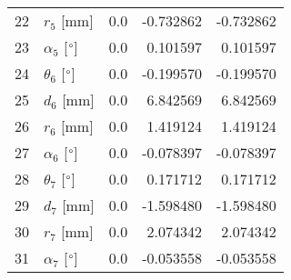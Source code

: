 \documentclass{standalone}%
\begin{document}
\begin{tabular}{llrrr}
22 &              $r_{5}$ [mm] &       0.0 &  -0.732862 &  -0.732862 \\
23 &  $\alpha_{5}$ [$\degree$] &       0.0 &   0.101597 &   0.101597 \\
24 &  $\theta_{6}$ [$\degree$] &       0.0 &  -0.199570 &  -0.199570 \\
25 &              $d_{6}$ [mm] &       0.0 &   6.842569 &   6.842569 \\
26 &              $r_{6}$ [mm] &       0.0 &   1.419124 &   1.419124 \\
27 &  $\alpha_{6}$ [$\degree$] &       0.0 &  -0.078397 &  -0.078397 \\
28 &  $\theta_{7}$ [$\degree$] &       0.0 &   0.171712 &   0.171712 \\
29 &              $d_{7}$ [mm] &       0.0 &  -1.598480 &  -1.598480 \\
30 &              $r_{7}$ [mm] &       0.0 &   2.074342 &   2.074342 \\
31 &  $\alpha_{7}$ [$\degree$] &       0.0 &  -0.053558 &  -0.053558 \\
\bottomrule
\end{tabular}
%
\end{document}
